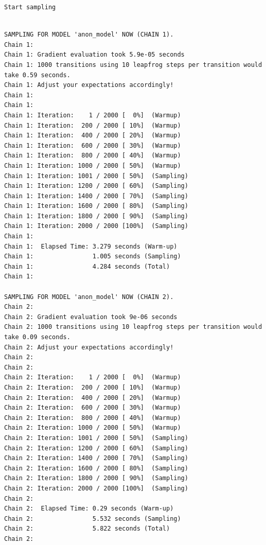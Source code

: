 \documentclass[
  10pt,
]{article}
\begin{document}
\begin{verbatim}
Start sampling
\end{verbatim}

\begin{verbatim}

SAMPLING FOR MODEL 'anon_model' NOW (CHAIN 1).
Chain 1: 
Chain 1: Gradient evaluation took 5.9e-05 seconds
Chain 1: 1000 transitions using 10 leapfrog steps per transition would take 0.59 seconds.
Chain 1: Adjust your expectations accordingly!
Chain 1: 
Chain 1: 
Chain 1: Iteration:    1 / 2000 [  0%]  (Warmup)
Chain 1: Iteration:  200 / 2000 [ 10%]  (Warmup)
Chain 1: Iteration:  400 / 2000 [ 20%]  (Warmup)
Chain 1: Iteration:  600 / 2000 [ 30%]  (Warmup)
Chain 1: Iteration:  800 / 2000 [ 40%]  (Warmup)
Chain 1: Iteration: 1000 / 2000 [ 50%]  (Warmup)
Chain 1: Iteration: 1001 / 2000 [ 50%]  (Sampling)
Chain 1: Iteration: 1200 / 2000 [ 60%]  (Sampling)
Chain 1: Iteration: 1400 / 2000 [ 70%]  (Sampling)
Chain 1: Iteration: 1600 / 2000 [ 80%]  (Sampling)
Chain 1: Iteration: 1800 / 2000 [ 90%]  (Sampling)
Chain 1: Iteration: 2000 / 2000 [100%]  (Sampling)
Chain 1: 
Chain 1:  Elapsed Time: 3.279 seconds (Warm-up)
Chain 1:                1.005 seconds (Sampling)
Chain 1:                4.284 seconds (Total)
Chain 1: 

SAMPLING FOR MODEL 'anon_model' NOW (CHAIN 2).
Chain 2: 
Chain 2: Gradient evaluation took 9e-06 seconds
Chain 2: 1000 transitions using 10 leapfrog steps per transition would take 0.09 seconds.
Chain 2: Adjust your expectations accordingly!
Chain 2: 
Chain 2: 
Chain 2: Iteration:    1 / 2000 [  0%]  (Warmup)
Chain 2: Iteration:  200 / 2000 [ 10%]  (Warmup)
Chain 2: Iteration:  400 / 2000 [ 20%]  (Warmup)
Chain 2: Iteration:  600 / 2000 [ 30%]  (Warmup)
Chain 2: Iteration:  800 / 2000 [ 40%]  (Warmup)
Chain 2: Iteration: 1000 / 2000 [ 50%]  (Warmup)
Chain 2: Iteration: 1001 / 2000 [ 50%]  (Sampling)
Chain 2: Iteration: 1200 / 2000 [ 60%]  (Sampling)
Chain 2: Iteration: 1400 / 2000 [ 70%]  (Sampling)
Chain 2: Iteration: 1600 / 2000 [ 80%]  (Sampling)
Chain 2: Iteration: 1800 / 2000 [ 90%]  (Sampling)
Chain 2: Iteration: 2000 / 2000 [100%]  (Sampling)
Chain 2: 
Chain 2:  Elapsed Time: 0.29 seconds (Warm-up)
Chain 2:                5.532 seconds (Sampling)
Chain 2:                5.822 seconds (Total)
Chain 2: 


\end{verbatim}
\end{document}
